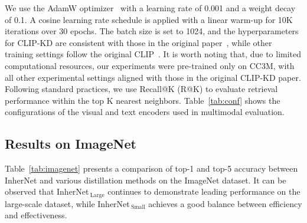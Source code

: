 \documentclass{article} %
\begin{document}
We use the AdamW optimizer~\citep{loshchilov2017decoupled} with a learning rate of 0.001 and a weight decay of 0.1. A cosine learning rate schedule is applied with a linear warm-up for 10K iterations over 30 epochs. The batch size is set to 1024, and the hyperparameters for CLIP-KD are consistent with those in the original paper~\citep{yang2024clip}, while other training settings follow the original CLIP~\citep{radford2021learning}. It is worth noting that, due to limited computational resources, our experiments were pre-trained only on CC3M, with all other experimental settings aligned with those in the original CLIP-KD paper. Following standard practices, we use Recall@K (R@K) to evaluate retrieval performance within the top K nearest neighbors. Table~\ref{tab:conf} shows the configurations of the visual and text encoders used in multimodal evaluation.

\subsection{Results on ImageNet}
\label{sec:results}

Table~\ref{tab:imagenet} presents a comparison of top-1 and top-5 accuracy between InherNet and various distillation methods on the ImageNet dataset. It can be observed that InherNet$_{\ \text{Large}}$ continues to demonstrate leading performance on the large-scale dataset, while InherNet$_{\ \text{Small}}$ achieves a good balance between efficiency and effectiveness.

\begin{table}[t]
\centering
\caption{Comparison of top-1 and top-5 Accuracy (\%) on the ImageNet validation set between InherNet and previous state-of-the-art knowledge distillation methods, using ResNet34 as the teacher and ResNet18 as the student.}
\vspace{-0.3cm}

\label{tab:imagenet}
\vspace{-0.3cm}
\end{table}
\end{document}
